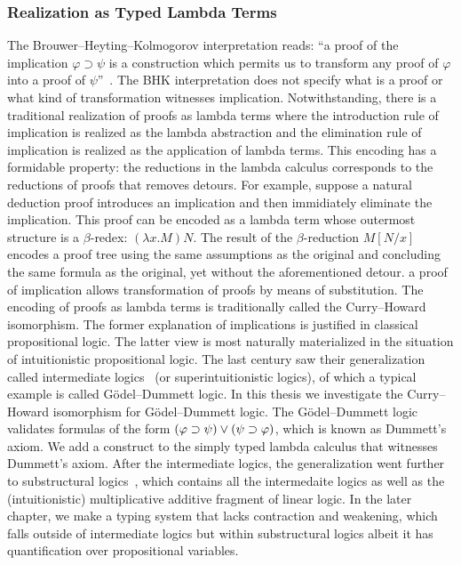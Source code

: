 \subsubsection{Realization as Typed Lambda Terms}

The Brouwer--Heyting--Kolmogorov interpretation reads: ``a proof of the
implication $\varphi\supset\psi$ is a construction which permits us to
 transform any proof of $\varphi$ into a proof of $\psi$''~.
The BHK
interpretation does not specify what is a proof or what kind of
transformation witnesses implication.
Notwithstanding, there is a
traditional realization of proofs as lambda terms where the
introduction rule of implication is realized as the lambda abstraction
and the elimination rule of implication is realized as the application
of lambda terms.
This encoding has a formidable property:
the reductions in the lambda calculus corresponds to the reductions of
proofs that
removes detours.
For example, suppose a natural deduction proof introduces an implication and then
immidiately eliminate the
implication.  This proof can be encoded as a lambda term whose outermost
structure is a $\beta$-redex: $(\lambda x. M)N$.
 The result of the $\beta$-reduction $M[N/x]$ encodes a proof tree using
 the same assumptions as the original and concluding the same formula as
 the original, yet without the aforementioned detour.
 a proof of implication allows transformation of proofs
by means of
substitution.  The encoding of proofs as lambda terms is traditionally
called the Curry--Howard isomorphism.
The former explanation of implications is justified in classical propositional logic.
The latter view is most naturally materialized in the situation of
intuitionistic propositional logic.  The last century saw their
generalization called intermediate logics~\citep{umezawa} (or superintuitionistic
logics), of which a typical example is
called G\"odel--Dummett logic.
In this thesis we investigate the Curry--Howard isomorphism for
G\"odel--Dummett logic.  The G\"odel--Dummett
logic validates formulas
of the form $(\varphi\supset\psi)\lor(\psi\supset\varphi)$, which is known as
Dummett's axiom.  We add a construct to the simply typed lambda
calculus
that witnesses Dummett's axiom.
After the intermediate logics, the generalization went further to
substructural
logics~\citep{residuated}, which contains all the intermedaite logics as
well as the
(intuitionistic) multiplicative
additive fragment of linear logic.
In the later chapter, we make a typing system that lacks contraction and
weakening, which falls outside of intermediate logics but within
substructural logics albeit it has quantification over propositional variables.


